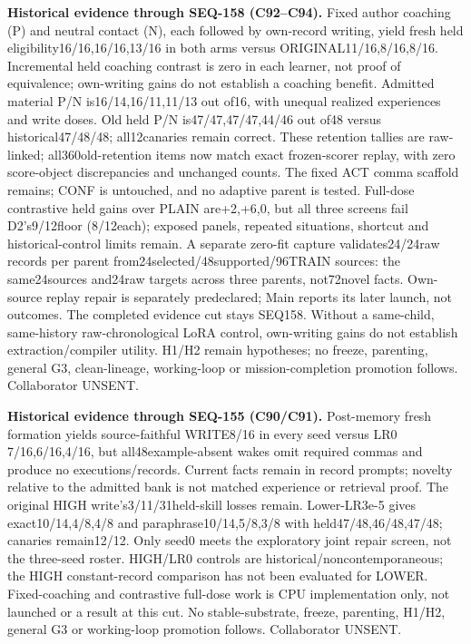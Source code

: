 \documentclass[11pt]{article}
\begin{document}
\noindent\textbf{Historical evidence through SEQ-158 (C92--C94).}
Fixed author coaching (P) and neutral contact (N), each followed by own-record
writing, yield fresh held eligibility16/16,16/16,13/16 in both arms versus
ORIGINAL11/16,8/16,8/16. Incremental held coaching contrast is zero in each learner, not
proof of equivalence; own-writing gains do not establish a coaching benefit.
Admitted material P/N is16/14,16/11,11/13 out of16, with unequal realized
experiences and write doses. Old held P/N is47/47,47/47,44/46 out of48 versus
historical47/48/48; all12canaries remain correct. These retention tallies are
raw-linked; all360old-retention items now match exact frozen-scorer replay,
with zero score-object discrepancies and unchanged counts.
The fixed ACT comma scaffold remains; CONF is untouched, and no adaptive parent
is tested. Full-dose contrastive held gains over PLAIN are+2,+6,0, but all three
screens fail D2's9/12floor (8/12each); exposed panels, repeated situations,
shortcut and historical-control limits remain. A separate zero-fit capture
validates24/24raw records per parent from24selected/48supported/96TRAIN sources:
the same24sources and24raw targets across three parents, not72novel facts.
Own-source replay repair is separately predeclared; Main reports its later launch,
not outcomes. The completed evidence cut stays SEQ158. Without a same-child,
same-history raw-chronological LoRA control, own-writing gains do not establish
extraction/compiler utility. H1/H2 remain hypotheses; no freeze, parenting, general G3, clean-lineage,
working-loop or mission-completion promotion follows. Collaborator UNSENT.

\noindent\textbf{Historical evidence through SEQ-155 (C90/C91).}
Post-memory fresh formation yields source-faithful WRITE8/16 in every seed
versus LR0 7/16,6/16,4/16, but all48example-absent wakes omit required commas
and produce no executions/records. Current facts remain in record prompts;
novelty relative to the admitted bank is not matched experience or retrieval proof.
The original HIGH write's3/11/31held-skill losses remain. Lower-LR3e-5 gives
exact10/14,4/8,4/8 and paraphrase10/14,5/8,3/8 with held47/48,46/48,47/48;
canaries remain12/12. Only seed0 meets the exploratory joint repair screen,
not the three-seed roster. HIGH/LR0 controls are historical/noncontemporaneous;
the HIGH constant-record comparison has not been evaluated for LOWER.
Fixed-coaching and contrastive full-dose work is CPU implementation only,
not launched or a result at this cut. No stable-substrate, freeze, parenting,
H1/H2, general G3 or working-loop promotion follows. Collaborator UNSENT.
\end{document}
